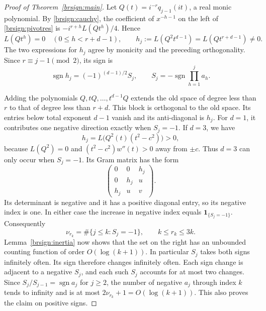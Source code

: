 \documentclass[11pt,a4paper]{article}
\theoremstyle{definition}
\theoremstyle{remark}
\numberwithin{equation}{section}
\begin{document}
\begin{proof}[Proof of Theorem~\ref{brsign:main}]
Let $Q(t)=i^{-r}q_{j-1}(it)$, a real monic polynomial. By
\eqref{brsign:cauchy}, the coefficient of $x^{-h-1}$ on the left of
\eqref{brsign:pivotres} is $-i^{r+h} L(Qt^h)/4$. Hence
\[
 L(Qt^h)=0\quad (0\le h<r+d-1),\qquad
 h_j:=L(Q^2t^{d-1})=L(Qt^{r+d-1})\ne0.
\]
The two expressions for $h_j$ agree by monicity and the preceding
orthogonality. Since $r\equiv j-1\pmod2$, its sign is
\begin{equation}\label{brsign:pivotsign}
 \operatorname{sgn}h_j=(-1)^{(d-1)/2} S_j,
 \qquad S_j=-\operatorname{sgn}\prod_{h=1}^j a_h.
\end{equation}

Adding the polynomials $Q,tQ,\ldots,t^{d-1}Q$ extends the old space of
degree less than $r$ to that of degree less than $r+d$. This block is
orthogonal to the old space. Its entries below total exponent $d-1$
vanish and its anti-diagonal is $h_j$. For $d=1$, it contributes one
negative direction exactly when $S_j=-1$. If $d=3$, we have
\[
 h_j=L\bigl(Q^2(t)(t^2-c^2)\bigr)>0,
\]
because $L(Q^2)=0$ and $(t^2-c^2)w''(t)>0$ away from $\pm c$.
Thus $d=3$ can only occur when $S_j=-1$. Its Gram matrix has the form
\[
 \begin{pmatrix}0&0&h_j\\0&h_j&u\\h_j&u&v\end{pmatrix}.
\]
Its determinant is negative and it has a positive diagonal entry, so
its negative index is one. In either case the increase in negative
index equals $\mathbf{1}_{\{S_j=-1\}}$. Consequently
\begin{equation}\label{brsign:exact}
 \nu_{r_k}=\#\{j\le k:S_j=-1\},\qquad k\le r_k\le3k.
\end{equation}
Lemma~\ref{brsign:inertia} now shows that the set on the right has an
unbounded counting function of order $O(\log(k+1))$. In particular
$S_j$ takes both signs infinitely often. Its sign therefore changes
infinitely often. Each sign change is adjacent to a negative $S_j$,
and each such $S_j$ accounts for at most two changes. Since
$S_j/S_{j-1}=\operatorname{sgn}a_j$ for $j\ge2$, the number of
negative $a_j$ through index $k$ tends to infinity and is at most
$2\nu_{r_k}+1=O(\log(k+1))$. This also proves the claim on positive signs.
\end{proof}
\end{document}
